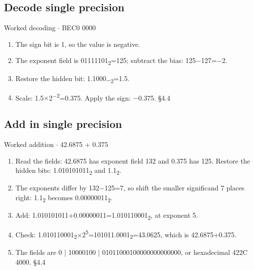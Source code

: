 \documentclass[11pt]{article}
\begin{document}
\begin{keepsection}
\begin{keepsection}
\subsection{Decode single precision}

\begin{workedbox}{Worked decoding \ensuremath{\cdot} BEC0 0000}
\begin{enumerate}
\item The sign bit is 1, so the value is negative.
\item The exponent field is 01111101\textsubscript{2}=125; subtract the bias: 125\ensuremath{-}127=\ensuremath{-}2.
\item Restore the hidden bit: 1.1000…\textsubscript{2}=1.5.
\item Scale: 1.5\ensuremath{\times}2\textsuperscript{\ensuremath{-}2}=0.375. Apply the sign: \ensuremath{-}0.375. \hfill{\small\color{FAUblue}§4.4}
\end{enumerate}
\end{workedbox}
\end{keepsection}

\begin{keepsection}
\subsection{Add in single precision}

\begin{workedbox}{Worked addition \ensuremath{\cdot} 42.6875 + 0.375}
\begin{enumerate}
\item Read the fields: 42.6875 has exponent field 132 and 0.375 has 125. Restore the hidden bits: 1.010101011\textsubscript{2} and 1.1\textsubscript{2}.
\item The exponents differ by 132\ensuremath{-}125=7, so shift the smaller significand 7 places right: 1.1\textsubscript{2} becomes 0.00000011\textsubscript{2}.
\item Add: 1.010101011+0.00000011=1.010110001\textsubscript{2}, at exponent 5.
\item Check: 1.010110001\textsubscript{2}\ensuremath{\times}2\textsuperscript{5}=101011.0001\textsubscript{2}=43.0625, which is 42.6875+0.375.
\item The fields are 0 | 10000100 | 01011000100000000000000, or hexadecimal 422C 4000. \hfill{\small\color{FAUblue}§4.4}
\end{enumerate}
\end{workedbox}


\end{keepsection}
\end{keepsection}
\end{document}
